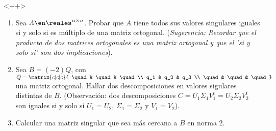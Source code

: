 \begin{enunciado}{\ejExtra} <++>
  \begin{enumerate}[label=\alph*)]
    \item
          Sea $A \en \reales^{n \times n}$. Probar que $A$ tiene todos sus valores singulares iguales si y solo si
          es múltiplo de una matriz ortogonal.
          (\textit{Sugerencia: Recordar que el producto de dos matrices ortogonales es una matriz ortogonal y que el 'si y solo si' son dos implicaciones}).

    \item Sea $B = (-2)Q$, con
          $Q =
            \matriz{c|c|c}{
              \quad& \quad& \quad\\
              q_1 & q_2 & q_3 \\
              \quad& \quad& \quad
            }$ una matriz ortogonal. Hallar dos descomposiciones en valores sigulares distintas de $B$.
          (Observación: dos descomposiciones
          $C =
            U_1 \Sigma_1 V_1^t =
            U_2 \Sigma_2 V_2^t
          $ son iguales si y solo si
          $U_1 = U_2$, $\Sigma_1 = \Sigma_2 $ y $ V_1 = V_2$).

    \item Calcular una matriz singular que sea más cercana a $B$ en norma 2.
  \end{enumerate}
\end{enunciado}

